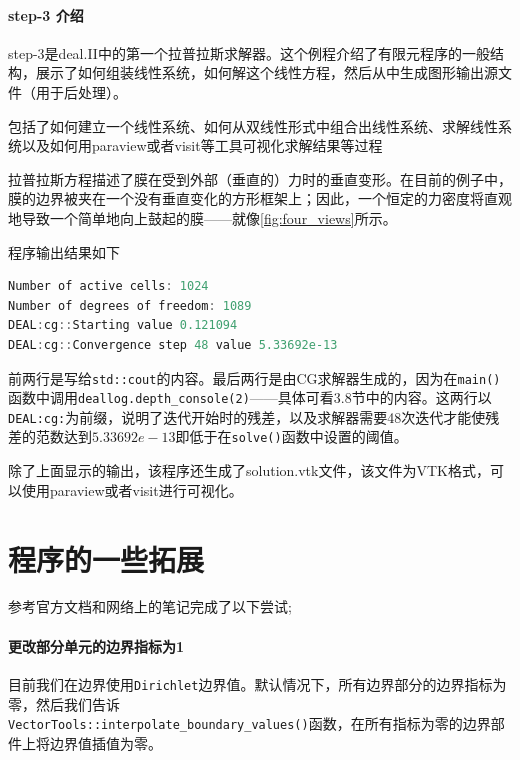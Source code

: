 \documentclass[12pt, a4paper]{article}
\numberwithin{equation}{section} %
\begin{document}
\paragraph{step-3 介绍}
step-3是deal.II中的第一个拉普拉斯求解器。这个例程介绍了有限元程序的一般结构，展示了如何组装线性系统，如何解这个线性方程，然后从中生成图形输出源文件（用于后处理）。

包括了如何建立一个线性系统、如何从双线性形式中组合出线性系统、求解线性系统以及如何用paraview或者visit等工具可视化求解结果等过程

拉普拉斯方程描述了膜在受到外部（垂直的）力时的垂直变形。在目前的例子中，膜的边界被夹在一个没有垂直变化的方形框架上；因此，一个恒定的力密度将直观地导致一个简单地向上鼓起的膜——就像\ref{fig:four_views}所示。

程序输出结果如下
\begin{lstlisting}[language=c]
Number of active cells: 1024
Number of degrees of freedom: 1089
DEAL:cg::Starting value 0.121094
DEAL:cg::Convergence step 48 value 5.33692e-13
\end{lstlisting}
前两行是写给\verb|std::cout|的内容。最后两行是由CG求解器生成的，因为在\verb|main()|函数中调用\verb|deallog.depth_console(2)|——具体可看3.8节中的内容。这两行以\verb|DEAL:cg:|为前缀，说明了迭代开始时的残差，以及求解器需要48次迭代才能使残差的范数达到$5.33692e-13$即低于在\verb|solve()|函数中设置的阈值。

除了上面显示的输出，该程序还生成了solution.vtk文件，该文件为VTK格式，可以使用paraview或者visit进行可视化。


\newpage
\section{程序的一些拓展}
参考官方文档\cite{refa}和网络上的笔记\cite{zhihu}完成了以下尝试;
\paragraph{更改部分单元的边界指标为1}

目前我们在边界使用\verb|Dirichlet|边界值。默认情况下，所有边界部分的边界指标为零，然后我们告诉\\
\verb|VectorTools::interpolate_boundary_values()|函数，在所有指标为零的边界部件上将边界值插值为零。
\end{document}
